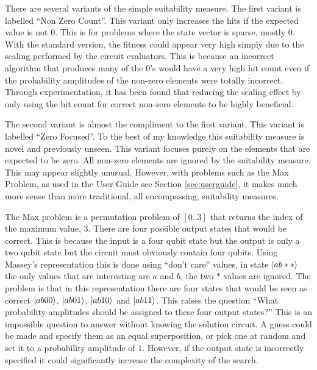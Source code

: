 There are several variants of the simple suitability measure.
The first variant is labelled ``Non Zero Count''.
This variant only increases the hits if the expected value is not $0$.
This is for problems where the state vector is sparse, mostly $0$.
With the standard version, the fitness could appear very high simply due to the scaling performed by the circuit evaluators.
This is because an incorrect algorithm that produces many of the $0$'s would have a very high hit count even if the probability amplitudes of the non-zero elements were totally incorrect.
Through experimentation, it has been found that reducing the scaling effect by only using the hit count for correct non-zero elements to be highly beneficial.

The second variant is almost the compliment to the first variant.
This variant is labelled ``Zero Focused''.
To the best of my knowledge this suitability measure is novel and previously unseen.
This variant focuses purely on the elements that are expected to be zero.
All non-zero elements are ignored by the suitability measure.
This may appear slightly unusual.
However, with problems such as the Max Problem, as used in the User Guide see Section \ref{sec:userguide}, it makes much more sense than more traditional, all encompassing, suitability measures.

The Max problem is a permutation problem of $[0..3]$ that returns the index of the maximum value, $3$.
There are four possible output states that would be correct.
This is because the input is a four qubit state but the output is only a two qubit state but the circuit must obviously contain four qubits.
Using Massey's\cite{masseythesis} representation this is done using ``don't care'' values, in state $\left\vert{ab**}\right\rangle$ the only values that are interesting are $a$ and $b$, the two $*$ values are ignored.
The problem is that in this representation there are four states that would be seen as correct $\left\vert{ab00}\right\rangle$, $\left\vert{ab01}\right\rangle$, $\left\vert{ab10}\right\rangle$ and $\left\vert{ab11}\right\rangle$.
This raises the question ``What probability amplitudes should be assigned to these four output states?''
This is an impossible question to answer without knowing the solution circuit.
A guess could be made and specify them as an equal superposition, or pick one at random and set it to a probability amplitude of $1$.
However, if the output state is incorrectly specified it could significantly increase the complexity of the search.

